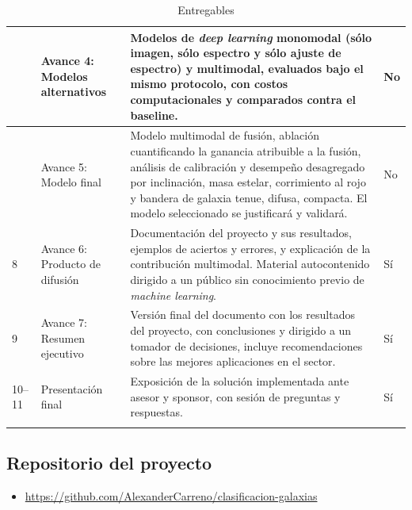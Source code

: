 \documentclass[12pt]{article}
\begin{document}
\begin{longtable}{|>{\raggedright\arraybackslash}p{}|>{\raggedright\arraybackslash}p{}|>{\raggedright\arraybackslash}p{}|>{\raggedright\arraybackslash}p{}|}
6 &
Avance 4: Modelos alternativos &
Modelos de \textit{deep learning} monomodal (sólo imagen, sólo espectro y sólo ajuste de espectro) y multimodal, evaluados bajo el mismo protocolo, con costos computacionales y comparados contra el baseline. &
No
\\ \hline

7 &
Avance 5: Modelo final &
Modelo multimodal de fusión, ablación cuantificando la ganancia atribuible a la fusión, análisis de calibración y desempeño desagregado por inclinación, masa estelar, corrimiento al rojo y bandera de galaxia tenue, difusa, compacta. El modelo seleccionado se justificará y validará. &
No
\\ \hline

8 &
Avance 6: Producto de difusión &
Documentación del proyecto y sus resultados, ejemplos de aciertos y errores, y explicación de la contribución multimodal. Material autocontenido dirigido a un público sin conocimiento previo de \textit{machine learning}. &
Sí
\\ \hline

9 &
Avance 7: Resumen ejecutivo &
Versión final del documento con los resultados del proyecto, con conclusiones y dirigido a un tomador de decisiones, incluye recomendaciones sobre las mejores aplicaciones en el sector. &
Sí
\\ \hline

10--11 &
Presentación final &
Exposición de la solución implementada ante asesor y sponsor, con sesión de preguntas y respuestas. &
Sí
\\ \hline

\caption{Entregables}
\label{Entregables}
\end{longtable}

\normalsize

\subsection{Repositorio del proyecto}

\begin{itemize}
    \item \url{https://github.com/AlexanderCarreno/clasificacion-galaxias}
\end{itemize}

\end{document}
